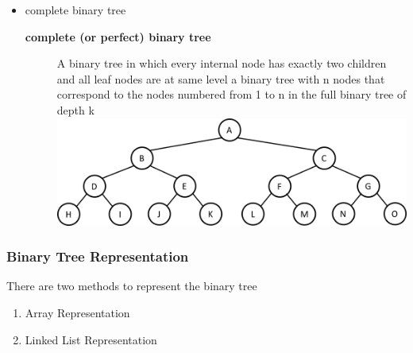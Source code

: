 \documentclass[newPxFont,sthlmFooter,nooffset]{beamer}
\begin{document}
\begin{frame}[t, allowframebreaks]
\begin{itemize}
\begin{description}
\newpage
~\bigskip
    \end{description}
  \item complete binary tree 
    \begin{description}
    \item[\textbf{complete (or perfect) binary tree}] A binary tree in which every internal node has exactly two children and all leaf nodes are at same level
a binary tree with n nodes that
      correspond to the nodes numbered from 1 to n in the full binary
      tree of depth k\\
        \includegraphics[height=0.3\textheight]{figures/fig06_complete.png}


    \end{description}

  \end{itemize}

\end{frame}


\begin{frame}[t]
  \frametitle{Binary Tree Representation}
There are two methods to represent the binary tree
\begin{enumerate}
\item Array Representation
\item Linked List Representation
\end{enumerate}
\end{frame}
\end{document}
